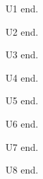 U1 \textcite{u1} end.

U2 \textcite{u2} end.

U3 \textcite{u3} end.

U4 \textcite{u4} end.

U5 \textcite{u5} end.

U6 \textcite{u6} end.

U7 \textcite{u7} end.

U8 \textcite{u8} end.
